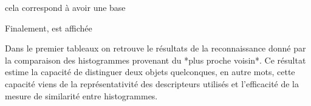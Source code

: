 cela correspond à avoir une base

Finalement,  est affichée

\begin{figure}[H]
\end{figure}


{\color{green}
Dans le premier tableaux on retrouve le résultats de la reconnaissance donné par la comparaison des histogrammes provenant du *plus proche voisin*. Ce résultat estime la capacité de distinguer deux objets quelconques, en autre mots, cette capacité viens de la représentativité des descripteurs utilisés et l'efficacité de la mesure de similarité entre histogrammes.
}
